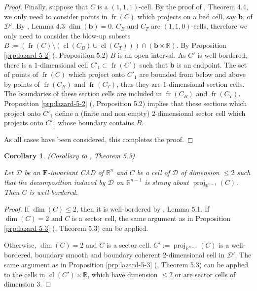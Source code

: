 \documentclass[
]{book}
\newtheorem{corollary}{Corollary}[chapter]
\theoremstyle{definition}
\theoremstyle{definition}
\theoremstyle{definition}
\theoremstyle{definition}
\theoremstyle{remark}
\begin{document}
\begin{proof}
Finally, suppose that \(C\) is a \((1,1,1)\)-cell.
By the proof of \citet{lazard10}, Theorem 4.4, we only need to consider points in \({\operatorname{fr} \left( C \right)}\) which projects on a bad cell, say \(\mathbf{b}\), of \(\mathcal{D'}\).
By \citet{lazard10}, Lemma 4.3 \(\dim(\mathbf{b}) = 0\).
\(C_B\) and \(C_T\) are \((1,1,0)\)-cells, therefore we only need to consider the blow-up subsets \(B := ({\operatorname{fr} \left( C \right)} \setminus ({\operatorname{cl} \left( C_B \right)} \cup {\operatorname{cl} \left( C_T \right)})) \cap (\mathbf{b} \times \mathbb{R})\). By Proposition \ref{prp:lazard-5-2} (\citet{lazard10}, Proposition 5.2) \(B\) is an open interval.
As \(C'\) is well-bordered, there is a \(1\)-dimensional cell \(C'_1 \subset {\operatorname{fr} \left( C' \right)}\) such that \(\mathbf{b}\) is an endpoint.
The set of points of \({\operatorname{fr} \left( C \right)}\) which project onto \(C'_1\) are bounded from below and above by points of \({\operatorname{fr} \left( C_B \right)}\) and \({\operatorname{fr} \left( C_T \right)}\), thus they are \(1\)-dimensional section cells. The boundaries of these section cells are included in \({\operatorname{fr} \left( C_B \right)}\) and \({\operatorname{fr} \left( C_T \right)}\).
Proposition \ref{prp:lazard-5-2} (\citet{lazard10}, Proposition 5.2) implies that these sections which project onto \(C'_1\) define a (finite and non empty) \(2\)-dimensional sector cell which projects onto \(C'_1\) whose boundary
contains \(B\).

As all cases have been considered, this completes the proof.
\end{proof}

\begin{corollary}
\protect\hypertarget{cor:ext-lazard-5-3}{}\label{cor:ext-lazard-5-3}(Corollary to \citet{lazard10}, Theorem 5.3)

Let \(\mathcal{D}\) be an \(\mathbf{F}\)-invariant CAD of \(\mathbb{R}^n\) and \(C\) be a cell of \(\mathcal{D}\) of dimension \(\le 2\) such that the decomposition induced by \(\mathcal{D}\) on \(\mathbb{R}^{n-1}\) is strong about \({\operatorname{proj}_{\mathbb{R}^{n-1}}}(C)\). Then \(C\) is well-bordered.
\end{corollary}

\begin{proof}
If \(\dim(C) \le 2\), then it is well-bordered by \citet{lazard10}, Lemma 5.1.
If \(\dim(C) = 2\) and \(C\) is a sector cell, the same argument as in Proposition \ref{prp:lazard-5-3} (\citet{lazard10}, Theorem 5.3) can be applied.

Otherwise, \(\dim(C) = 2\) and \(C\) is a sector cell. \(C' := {\operatorname{proj}_{\mathbb{R}^{n-1}}}(C)\) is a well-bordered, boundary smooth and boundary coherent \(2\)-dimensional cell in \(\mathcal{D'}\). The same argument as in Proposition \ref{prp:lazard-5-3} (\citet{lazard10}, Theorem 5.3) can be applied to the cells in \({\operatorname{cl} \left( C' \right)} \times \mathbb{R}\), which have dimension \(\le 2\) or are sector cells of dimension \(3\).
\end{proof}
\end{document}

